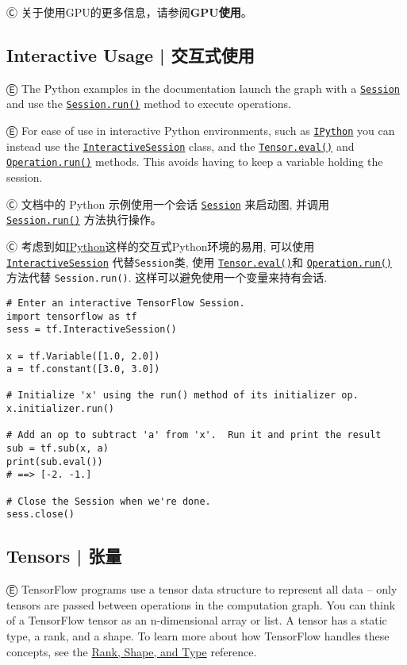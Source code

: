 Ⓒ 关于使用GPU的更多信息，请参阅\textbf{GPU使用}。

%
\subsection{Interactive Usage  |  交互式使用}

Ⓔ \textcolor{etc}{The Python examples in the documentation launch the graph with a \hyperref[class-tf.session]{\lstinline{Session}} and use the \hyperref[tf.session.run]{\lstinline{Session.run()}} method to execute operations.}

Ⓔ \textcolor{etc}{For ease of use in interactive Python environments, such as \href{http://ipython.org/}{\lstinline{IPython}} you can instead use the \hyperref[class-tf.interactivesession]{\lstinline{InteractiveSession}} class, and the \hyperref[tf.tensor.eval]{\lstinline{Tensor.eval()}} and \hyperref[tf.operation.run]{\lstinline{Operation.run()}} methods. This avoids having to keep a variable holding the session.}

Ⓒ 文档中的 Python 示例使用一个会话 \hyperref[class-tf.session]{\lstinline{Session}} 来启动图, 并调用 \hyperref[tf.session.run]{\lstinline{Session.run()}} 方法执行操作。

Ⓒ 考虑到如\href{http://ipython.org}{IPython}这样的交互式Python环境的易用, 可以使用\hyperref[class-tf.interactivesession]{\lstinline{InteractiveSession}} 代替\lstinline{Session}类, 使用 \hyperref[tf.tensor.eval]{\lstinline{Tensor.eval()}}和 \hyperref[tf.operation.run]{\lstinline{Operation.run()}} 方法代替 \lstinline{Session.run()}. 这样可以避免使用一个变量来持有会话.

\begin{lstlisting}
# Enter an interactive TensorFlow Session.
import tensorflow as tf
sess = tf.InteractiveSession()

x = tf.Variable([1.0, 2.0])
a = tf.constant([3.0, 3.0])

# Initialize 'x' using the run() method of its initializer op.
x.initializer.run()

# Add an op to subtract 'a' from 'x'.  Run it and print the result
sub = tf.sub(x, a)
print(sub.eval())
# ==> [-2. -1.]

# Close the Session when we're done.
sess.close()
\end{lstlisting}

%

\subsection{Tensors  |  张量}
Ⓔ \textcolor{etc}{TensorFlow programs use a tensor data structure to represent all data -- only tensors are passed between operations in the computation graph. You can think of a TensorFlow tensor as an n-dimensional array or list. A tensor has a static type, a rank, and a shape. To learn more about how TensorFlow handles these concepts, see the \href{https://www.tensorflow.org/versions/master/resources/dims_types.html#tensor-ranks-shapes-and-types}{Rank, Shape, and Type} reference.}

